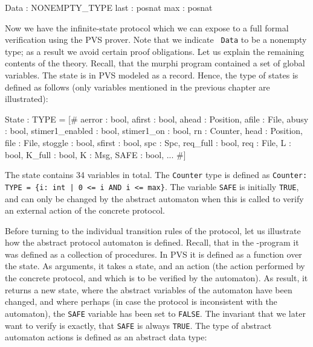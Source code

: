 \begin{smallsession}
  Data : NONEMPTY_TYPE
  last : posnat
  max  : posnat
\end{smallsession}

Now we have the infinite-state protocol which we  can expose to a full
formal verification using the PVS prover.  Note  that we indicate {\tt
Data} to   be a nonempty type;   as  a result  we  avoid certain proof
obligations.   Let   us  explain   the  remaining    contents   of the
theory.  Recall, that  the murphi program   contained a set of  global
variables. The state is  in PVS modeled  as a record.  Hence, the type
of  states is  defined as  follows (only   variables mentioned  in the
previous chapter are illustrated):


\begin{smallsession}
  State : TYPE =
    [# aerror          : bool,
       afirst          : bool,
       ahead           : Position,
       afile           : File,
       abusy           : bool,
       stimer1_enabled : bool,
       stimer1_on      : bool,
       rn              : Counter,
       head            : Position,
       file            : File,
       stoggle         : bool,
       sfirst          : bool,
       spc             : Spc,
       req_full        : bool,
       req             : File,
       L               : bool,
       K_full          : bool,
       K               : Msg,
       SAFE            : bool, 
       ... 
    #]
\end{smallsession}

The state  contains  34 variables in total. The  {\tt Counter} type is
defined as  {\tt Counter: TYPE  = \{i:  int | 0 <= i AND i  <= max\}}.
The  variable  {\tt SAFE} is  initially {\tt TRUE}, and  can  only  be
changed by  the  abstract automaton when this  is  called to verify  an
external action of the concrete protocol.

Before turning to the individual transition rules of the protocol, let
us illustrate how the abstract protocol automaton is defined.  Recall,
that  in the \Murphi-program   it was   defined  as  a  collection  of
procedures.  In PVS it  is defined  as a function   over the state. As
arguments, it takes  a state, and an action  (the action  performed by
the  concrete  protocol,  and  which   is  to  be   verified by    the
automaton).  As result, it returns  a  new state,  where the  abstract
variables of  the automaton have been changed,  and  where perhaps (in
case the protocol is inconsistent  with the automaton), the {\tt SAFE}
variable has  been set to  {\tt FALSE}.   The  invariant that we later
want to verify is  exactly, that {\tt SAFE} is  always {\tt TRUE}. The
type of  abstract automaton  actions is  defined  as an abstract  data
type:


